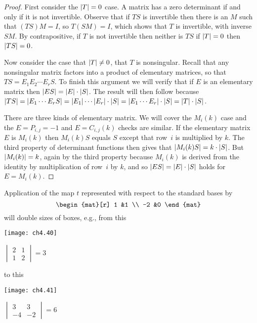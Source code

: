 \begin{proof}
First consider the $\deter{T}=0$ case.
A matrix has a zero determinant if and only if it is not invertible.
Observe that if \( TS \) is invertible then there
is an $M$ such that \( (TS)M=I \), so 
\( T(SM)=I \), which shows that \( T \) is invertible, with inverse $SM$.
By contrapositive, 
if \( T \) is not invertible then neither is \( TS \) \Dash 
if $\deter{T}=0$ then $\deter{TS}=0$.

Now consider the case that $\deter{T}\neq 0$, that $T$ is nonsingular. 
Recall that any nonsingular matrix factors into a product 
of elementary matrices, so that $TS=E_1E_2\cdots E_rS$.
To finish this argument 
we will verify that if $E$ is an elementary matrix then
\( \deter{ES}=\deter{E}\cdot\deter{S} \). 
The result will then follow because 
$\deter{TS}=\deter{E_1\cdots E_rS}=\deter{E_1}\cdots\deter{E_r}\cdot\deter{S}
  =\deter{E_1\cdots E_r}\cdot\deter{S}=\deter{T}\cdot\deter{S}$.

There are three kinds of elementary matrix. 
We will cover the $M_i(k)$ case and
the $E=P_{i,j}=-1$ and $E=C_{i,j}(k)$ checks are similar.
If the elementary matrix $E$ is $M_i(k)$ 
then $M_i(k)S$ equals $S$ except that row~$i$ is multiplied by $k$.
The third property of determinant functions
then gives that $\deter{M_i(k)S}=k\cdot\deter{S}$.
But $\deter{M_i(k)}=k$, again by the third property because
$M_i(k)$ is derived from the identity by multiplication of row~$i$ by
$k$, and so \( \deter{ES}=\deter{E}\cdot\deter{S} \) holds for
$E=M_i(k)$.
\end{proof}


\begin{example}
Application of the map $t$ represented with respect to the standard  
bases by
\begin{equation*}
  \begin{mat}[r]
    1  &1  \\
   -2  &0
  \end{mat}
\end{equation*}
will double sizes of boxes, e.g., from this
\begin{center}
    \parbox{1.5in}{\hbox{}\hfil\texttt{[image: ch4.40]}\hfil\hbox{}}  
    \quad
    $\begin{vmatrix}
      2  &1  \\
      1  &2
    \end{vmatrix}=3$
\end{center}
to this
\begin{center}
    \parbox{1.5in}{\hbox{}\hfil\texttt{[image: ch4.41]}\hfil\hbox{}}  
    \quad
    $\begin{vmatrix}
        3  &3  \\
       -4  &-2
     \end{vmatrix}=6$
\end{center}
\end{example}


